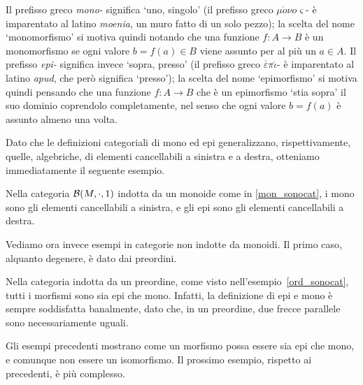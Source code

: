 \begin{terminology}
	Il prefisso greco \emph{mono-} significa `uno, singolo' (il prefisso greco \(\mu\acute{o}\nu o\varsigma\)- è imparentato al latino \emph{moenia}, un muro fatto di un solo pezzo); la scelta del nome `monomorfismo' si motiva quindi notando che una funzione \(f : A\to B\) è un monomorfismo se ogni valore \(b=f(a) \in B\) viene assunto per al più un \(a\in A\). Il prefisso \emph{epi-} significa invece `sopra, presso' (il prefisso greco \(\overset,\varepsilon\pi\acute{\iota}\)- è imparentato al latino \emph{apud}, che però significa `presso'); la scelta del nome `epimorfismo' si motiva quindi pensando che una funzione \(f : A\to B\) che è un epimorfismo `stia sopra' il suo dominio coprendolo completamente, nel senso che ogni valore \(b=f(a)\) è assunto almeno una volta.
\end{terminology}
Dato che le definizioni categoriali di mono ed epi generalizzano, rispettivamente, quelle, algebriche, di elementi cancellabili a sinistra e a destra, otteniamo immediatamente il seguente esempio.
\begin{example}
	Nella categoria \(\mathcal{B}(M,\cdot,1)\) indotta da un monoide come in \ref{mon_sonocat}, i mono sono gli elementi cancellabili a sinistra,
	e gli epi sono gli elementi cancellabili a destra.
\end{example}
Vediamo ora invece esempi in categorie non indotte da monoidi. Il primo caso, alquanto degenere, è dato dai preordini.
\begin{example}\label{ex:mono-epi-preord}
	Nella categoria indotta da un preordine, come visto nell'esempio~\ref{ord_sonocat}, tutti i morfismi sono sia epi che mono. Infatti, la definizione di epi e mono è sempre soddisfatta banalmente, dato che, in un preordine, due frecce parallele sono necessariamente uguali.
\end{example}
Gli esempi precedenti mostrano come un morfismo possa essere sia epi che mono, e comunque non essere un isomorfismo. Il prossimo esempio, rispetto ai precedenti, è più complesso.

